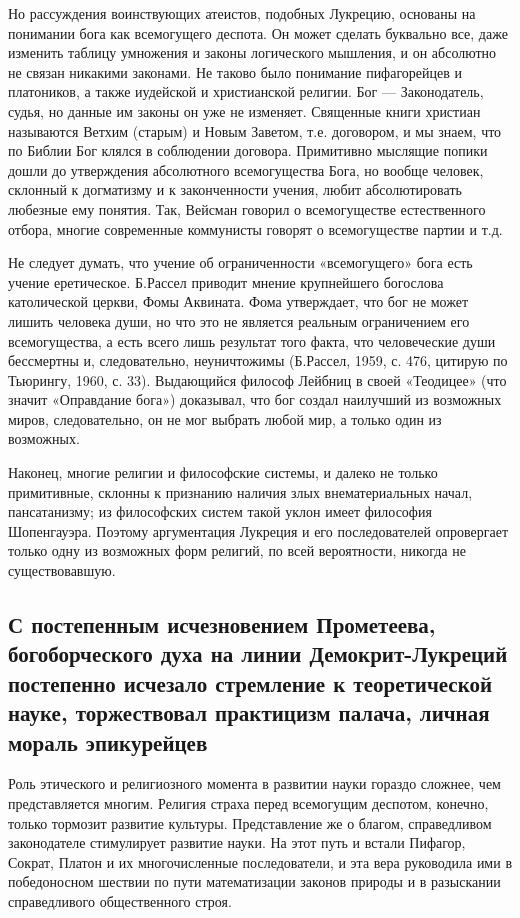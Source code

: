 Но рассуждения воинствующих атеистов, подобных Лукрецию, основаны на
понимании бога как всемогущего деспота. Он может сделать буквально
все, даже изменить таблицу умножения и законы логического мышления, и
он абсолютно не связан никакими законами. Не таково было понимание
пифагорейцев и платоников, а также иудейской и христианской религии.
Бог --- Законодатель, судья, но данные им законы он уже не изменяет.
Священные книги христиан называются Ветхим (старым) и Новым Заветом,
т.е. договором, и мы знаем, что по Библии Бог клялся в соблюдении
договора. Примитивно мыслящие попики дошли до утверждения абсолютного
всемогущества Бога, но вообще человек, склонный к догматизму и к
законченности учения, любит абсолютировать любезные ему понятия. Так,
Вейсман говорил о всемогуществе естественного отбора, многие
современные коммунисты говорят о всемогуществе партии и т.д.

Не следует думать, что учение об ограниченности «всемогущего» бога
есть учение еретическое. Б.Рассел приводит мнение крупнейшего
богослова католической церкви, Фомы Аквината. Фома утверждает, что бог
не может лишить человека души, но что это не является реальным
ограничением его всемогущества, а есть всего лишь результат того
факта, что человеческие души бессмертны и, следовательно,
неуничтожимы (Б.Рассел, 1959, с. 476, цитирую по Тьюрингу, 1960, с.
33). Выдающийся философ Лейбниц в своей «Теодицее» (что значит
«Оправдание бога») доказывал, что бог создал наилучший из возможных
миров, следовательно, он не мог выбрать любой мир, а только один из
возможных.

Наконец, многие религии и философские системы, и далеко не только
примитивные, склонны к признанию наличия злых внематериальных начал,
пансатанизму; из философских систем такой уклон имеет философия
Шопенгауэра. Поэтому аргументация Лукреция и его последователей
опровергает только одну из возможных форм религий, по всей
вероятности, никогда не существовавшую.

\subsection{С постепенным исчезновением Прометеева, богоборческого
духа на линии Демокрит-Лукреций постепенно исчезало
стремление к теоретической науке, торжествовал практицизм
палача, личная мораль эпикурейцев}

Роль этического и религиозного момента в развитии науки гораздо
сложнее, чем представляется многим. Религия страха перед всемогущим
деспотом, конечно, только тормозит развитие культуры. Представление
же о благом, справедливом законодателе стимулирует развитие науки. На
этот путь и встали Пифагор, Сократ, Платон и их многочисленные
последователи, и эта вера руководила ими в победоносном шествии по
пути математизации законов природы и в разыскании справедливого
общественного строя.


